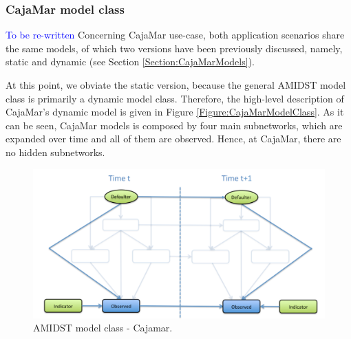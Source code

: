 \subsubsection{CajaMar model class}\label{cajamarAMIDSTModels}
\textcolor{blue}{To be re-written}
Concerning CajaMar use-case, both application scenarios share the same models, of which two versions have been previously discussed, namely, static and dynamic (see Section \ref{Section:CajaMarModels}). 

At this point, we obviate the static version, because the general AMIDST model class is primarily a dynamic model class. Therefore, the high-level description of CajaMar's dynamic model is given in Figure \ref{Figure:CajaMarModelClass}. As it can be seen, CajaMar models is composed by four main subnetworks, which are expanded over time and all of them are observed. Hence, at CajaMar, there are no hidden subnetworks. 


\begin{figure}[ht!]
\begin{center}
\includegraphics[scale=0.39]{./figures/AMIDSTModelClassCajamar.png}
\caption{\label{Figure:AMIDSTModelClassCajamar} AMIDST model class - Cajamar.}
\end{center}
\end{figure}



